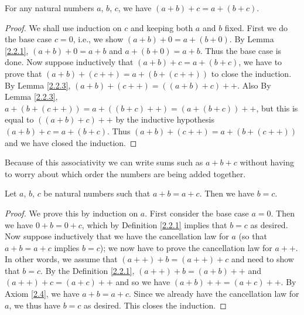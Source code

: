 \begin{proposition}\label{2.2.5}
For any natural numbers \(a\), \(b\), \(c\), we have \((a + b) + c = a + (b + c)\).
\end{proposition}

\begin{proof}
We shall use induction on \(c\) and keeping both \(a\) and \(b\) fixed.
First we do the base case \(c = 0\), i.e., we show \((a + b) + 0 = a + (b + 0)\).
By Lemma \ref{2.2.1}, \((a + b) + 0 = a + b\) and \(a + (b + 0) = a + b\).
Thus the base case is done.
Now suppose inductively that \((a + b) + c = a + (b + c)\), we have to prove that \((a + b) + (c++) = a + (b + (c++))\) to close the induction.
By Lemma \ref{2.2.3}, \((a + b) + (c++) = ((a + b) + c)++\).
Also By Lemma \ref{2.2.3}, \(a + (b + (c++)) = a + ((b + c)++) = (a + (b + c))++\), but this is equal to \(((a + b) + c)++\) by the inductive hypothesis \((a + b) + c = a + (b + c)\).
Thus \((a + b) + (c++) = a + (b + (c++))\) and we have closed the induction.
\end{proof}

\begin{note}
Because of this associativity we can write sums such as \(a + b + c\) without having to worry about which order the numbers are being added together.
\end{note}

\begin{proposition}\label{2.2.6}
Let \(a\), \(b\), \(c\) be natural numbers such that \(a + b = a + c\).
Then we have \(b = c\).
\end{proposition}

\begin{proof}
We prove this by induction on \(a\).
First consider the base case \(a = 0\).
Then we have \(0 + b = 0 + c\), which by Definition \ref{2.2.1} implies that \(b = c\) as desired.
Now suppose inductively that we have the cancellation law for \(a\) (so that \(a + b = a + c\) implies \(b = c\));
we now have to prove the cancellation law for \(a++\).
In other words, we assume that \((a++) + b = (a++) + c\) and need to show that \(b = c\).
By the Definition \ref{2.2.1}, \((a++) + b = (a + b)++\) and \((a++) + c = (a + c)++\) and so we have \((a + b)++ = (a + c)++\).
By Axiom \ref{2.4}, we have \(a + b = a + c\).
Since we already have the cancellation law for \(a\), we thus have \(b = c\) as desired.
This closes the induction.
\end{proof}

